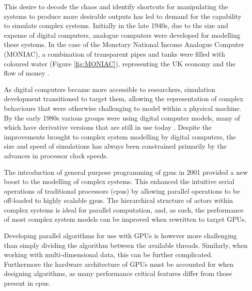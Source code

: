   This desire to decode the chaos and identify shortcuts for manipulating the systems to produce more desirable outputs has led to demand for the capability to simulate complex systems. Initially in the late 1940s, due to the size and expense of digital computers, analogue computers were developed for modelling these systems. In the case of the Monetary National Income Analogue Computer (MONIAC), a combination of transparent pipes and tanks were filled with coloured water (Figure \ref{fig:MONIAC}), representing the UK economy and the flow of money \cite{Pik54}.
  
  As digital computers became more accessible to researchers, simulation development transitioned to target them, allowing the representation of complex behaviours that were otherwise challenging to model within a physical machine. By the early 1980s various groups were using digital computer models, many of which have derivative versions that are still in use today \cite{Van82,GM85}. Despite the improvements brought to complex system modelling by digital computers, the size and speed of simulations has always been constrained primarily by the advances in processor clock speeds.
  
  The introduction of general purpose programming of \glspl{gpu} in 2001 provided a new boost to the modelling of complex systems. This enhanced the intuitive serial operations of traditional processors (\glspl{cpu}) by allowing parallel operations to be off-loaded to highly scalable \glspl{gpu}. The hierarchical structure of actors within complex systems is ideal for parallel computation, and, as such, the performance of most complex system models can be improved when rewritten to target GPUs.
  
  Developing parallel algorithms for use with GPUs is however more challenging than simply dividing the algorithm between the available threads. Similarly, when working with multi-dimensional data, this can be further complicated. Furthermore the hardware architecture of GPUs must be accounted for when designing algorithms, as many performance critical features differ from those present in \glspl{cpu}.
  
